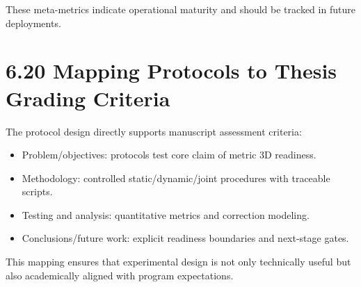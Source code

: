 These meta-metrics indicate operational maturity and should be tracked in future deployments.



\section{6.20 Mapping Protocols to Thesis Grading Criteria}
The protocol design directly supports manuscript assessment criteria:
\begin{itemize}
  \item Problem/objectives: protocols test core claim of metric 3D readiness.
  \item Methodology: controlled static/dynamic/joint procedures with traceable scripts.
  \item Testing and analysis: quantitative metrics and correction modeling.
  \item Conclusions/future work: explicit readiness boundaries and next-stage gates.
\end{itemize}

This mapping ensures that experimental design is not only technically useful but also academically aligned with program expectations.

